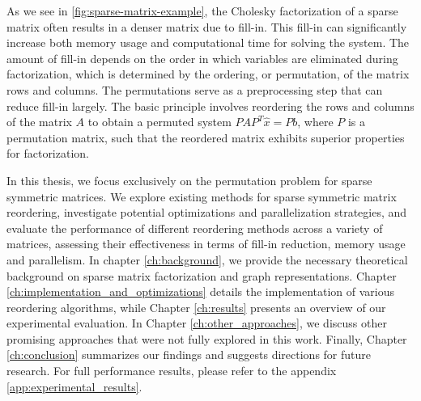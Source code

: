 As we see in \cref{fig:sparse-matrix-example}, the Cholesky factorization of a sparse matrix often results in a denser matrix due to fill-in. This fill-in can significantly increase both memory usage and computational time for solving the system. The amount of fill-in depends on the order in which variables are eliminated during factorization, which is determined by the ordering, or permutation, of the matrix rows and columns. The permutations serve as a preprocessing step that can reduce fill-in largely. The basic principle involves reordering the rows and columns of the matrix $A$ to obtain a permuted system $PAP^T \hat{x} = Pb$, where $P$ is a permutation matrix, such that the reordered matrix exhibits superior properties for factorization. 

In this thesis, we focus exclusively on the permutation problem for sparse symmetric matrices. We explore existing methods for sparse symmetric matrix reordering, investigate potential optimizations and parallelization strategies, and evaluate the performance of different reordering methods across a variety of matrices, assessing their effectiveness in terms of fill-in reduction, memory usage and parallelism. In chapter \ref{ch:background}, we provide the necessary theoretical background on sparse matrix factorization and graph representations. Chapter \ref{ch:implementation_and_optimizations} details the implementation of various reordering algorithms, while Chapter \ref{ch:results} presents an overview of our experimental evaluation. In Chapter \ref{ch:other_approaches}, we discuss other promising approaches that were not fully explored in this work. Finally, Chapter \ref{ch:conclusion} summarizes our findings and suggests directions for future research. For full performance results, please refer to the appendix \ref{app:experimental_results}.




